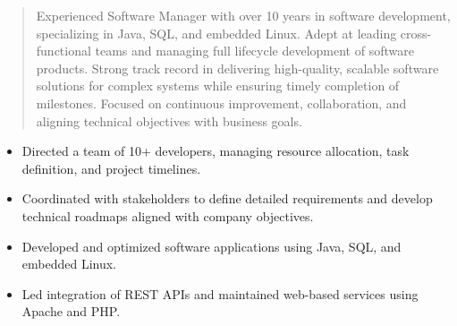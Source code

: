 



\makecvheader

\begin{quote}
  \noindent
  Experienced Software Manager with over 10 years in software development, specializing in Java, SQL, and embedded Linux. Adept at leading cross-functional teams and managing full lifecycle development of software products. Strong track record in delivering high-quality, scalable software solutions for complex systems while ensuring timely completion of milestones. Focused on continuous improvement, collaboration, and aligning technical objectives with business goals.
\end{quote}

\par\smallskip
\noindent
\begin{minipage}{20cm}
  \begin{minipage}{9.75cm}
    \begin{itemize}
      \item Directed a team of 10+ developers, managing resource allocation, task definition, and project timelines.
      \item Coordinated with stakeholders to define detailed requirements and develop technical roadmaps aligned with company objectives.
    \end{itemize}
  \end{minipage}
  \hfill
  \begin{minipage}{9.75cm}
    \begin{itemize}
      \item Developed and optimized software applications using Java, SQL, and embedded Linux.
      \item Led integration of REST APIs and maintained web-based services using Apache and PHP.
    \end{itemize}
  \end{minipage}
\end{minipage}
\par\smallskip
\divider

